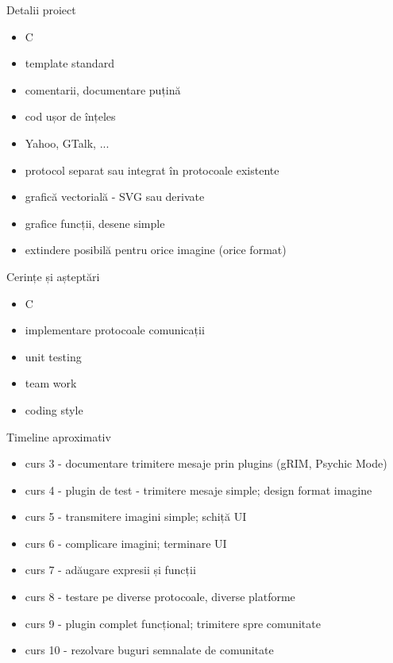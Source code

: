 \documentclass{beamer}
\begin{document}
\begin{frame}{Detalii proiect}
  \begin{itemize}
    \item C
    \item template standard
    \item comentarii, documentare puțină
    \item cod ușor de înțeles
    \item <2-> Yahoo, GTalk, ...
    \item <3-> protocol separat sau integrat în protocoale existente
    \item <4-> grafică vectorială - SVG sau derivate
    \item <5-> grafice funcții, desene simple
    \item <6-> extindere posibilă pentru orice imagine (orice format)
  \end{itemize}
\end{frame}

\begin{frame}{Cerințe și așteptări}
  \begin{itemize}
    \item C
    \item implementare protocoale comunicații
    \item unit testing
    \item team work
    \item coding style
  \end{itemize}
\end{frame}

\begin{frame}{Timeline aproximativ}
  \begin{itemize}[<+->]
    \item curs 3 - documentare trimitere mesaje prin plugins (gRIM, Psychic
    Mode)
    \item curs 4 - plugin de test - trimitere mesaje simple; design format
    imagine
    \item curs 5 - transmitere imagini simple; schiță UI
    \item curs 6 - complicare imagini; terminare UI
    \item curs 7 - adăugare expresii și funcții
    \item curs 8 - testare pe diverse protocoale, diverse platforme
    \item curs 9 - plugin complet funcțional; trimitere spre comunitate
    \item curs 10 - rezolvare buguri semnalate de comunitate
  \end{itemize}
\end{frame}
\end{document}
